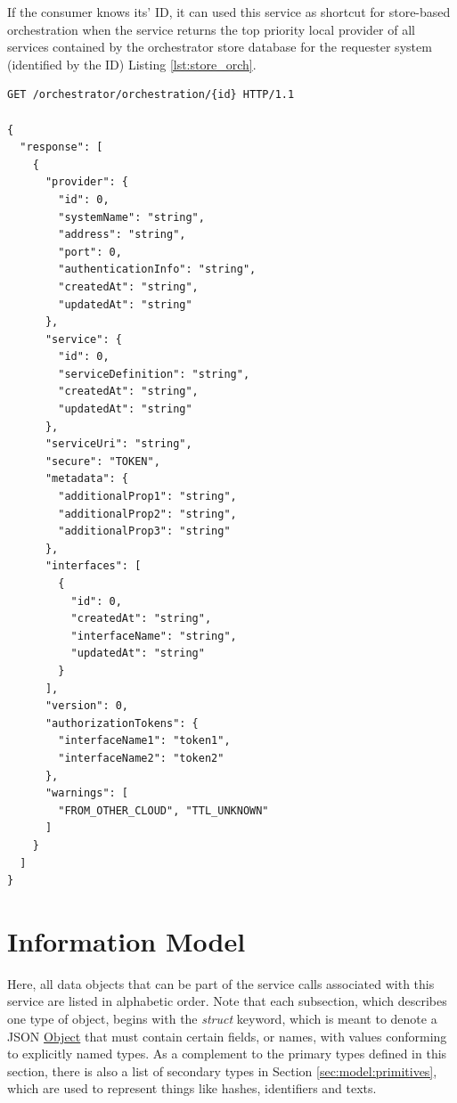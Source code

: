 \documentclass[a4paper]{arrowhead}
\newcommand{\fref}[1]{{\textcolor{ArrowheadBlue}{\hyperref[sec:functions:#1]{#1}}}}
\newcommand{\pref}[1]{{\textcolor{ArrowheadGrey}{\hyperref[sec:model:primitives:#1]{#1}}}}
\begin{document}

If the consumer knows its' ID, it can used this service as shortcut for store-based orchestration when the service returns the top priority local provider of all services contained by the orchestrator store database for the requester system (identified by the ID) Listing \ref{lst:store_orch}.

\begin{lstlisting}[language=http,label={lst:store_orch},caption={A \fref{Store orchestration by ID} invocation.}]
GET /orchestrator/orchestration/{id} HTTP/1.1

{
  "response": [
    {
      "provider": {
        "id": 0,
        "systemName": "string",
        "address": "string",
        "port": 0,
        "authenticationInfo": "string",
        "createdAt": "string",
        "updatedAt": "string"
      },
      "service": {
        "id": 0,
        "serviceDefinition": "string",
        "createdAt": "string",
        "updatedAt": "string"
      },
      "serviceUri": "string",
      "secure": "TOKEN",
      "metadata": {
        "additionalProp1": "string",
        "additionalProp2": "string",
        "additionalProp3": "string"
      },  
      "interfaces": [
        {
          "id": 0,
          "createdAt": "string",
          "interfaceName": "string",
          "updatedAt": "string"
        }
      ],
      "version": 0,
      "authorizationTokens": {
        "interfaceName1": "token1",
        "interfaceName2": "token2"
      },
      "warnings": [
        "FROM_OTHER_CLOUD", "TTL_UNKNOWN"
      ]
    }
  ]
}

\end{lstlisting}

\newpage

\section{Information Model}
\label{sec:model}

Here, all data objects that can be part of the service calls associated with this service are listed in alphabetic order.
Note that each subsection, which describes one type of object, begins with the \textit{struct} keyword, which is meant to denote a JSON \pref{Object} that must contain certain fields, or names, with values conforming to explicitly named types.
As a complement to the primary types defined in this section, there is also a list of secondary types in Section \ref{sec:model:primitives}, which are used to represent things like hashes, identifiers and texts.
\end{document}
